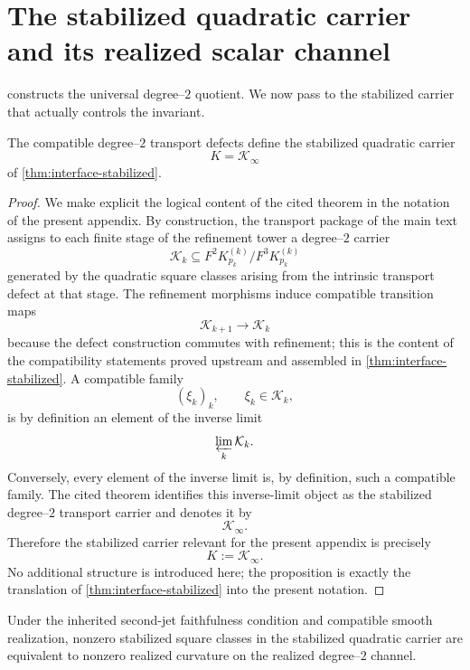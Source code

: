 \section{The stabilized quadratic carrier and its realized scalar channel}
\label{sec:fusion-K}
 constructs the universal degree--\(2\)
quotient.
We now pass to the stabilized carrier that actually controls the
invariant.
\begin{proposition}
	The compatible degree--\(2\) transport defects define the stabilized
	quadratic carrier
	\[
		K=\mathcal K_\infty
	\]
	of \cref{thm:interface-stabilized}.
\end{proposition}
\begin{proof}
	We make explicit the logical content of the cited theorem in the notation
	of the present appendix.
	By construction, the transport package of the main text assigns to each
	finite stage of the refinement tower a degree--\(2\) carrier
	\[
		\mathcal K_k
		\subseteq
		F^2K_{p_k}^{(k)}/F^3K_{p_k}^{(k)}
	\]
	generated by the quadratic square classes arising from the intrinsic
	transport defect at that stage.
	The refinement morphisms induce compatible transition maps
	\[
		\mathcal K_{k+1}\longrightarrow \mathcal K_k
	\]
	because the defect construction commutes with refinement; this is the
	content of the compatibility statements proved upstream and assembled in
	\cref{thm:interface-stabilized}.
	A compatible family
	\[
		(\xi_k)_k,\qquad \xi_k\in \mathcal K_k,
	\]
	is by definition an element of the inverse limit
	\[
		\varprojlim_k \mathcal K_k.
	\]
	Conversely, every element of the inverse limit is, by definition, such a
	compatible family. The cited theorem identifies this inverse-limit object
	as the stabilized degree--\(2\) transport carrier and denotes it by
	\[
		\mathcal K_\infty.
	\]
	Therefore the stabilized carrier relevant for the present appendix is
	precisely
	\[
		K:=\mathcal K_\infty.
	\]
	No additional structure is introduced here; the proposition is exactly
	the translation of \cref{thm:interface-stabilized} into the present
	notation.
\end{proof}
\begin{proposition}
	\label{prop:fusion-curvature}
	Under the inherited second-jet faithfulness condition and compatible
	smooth realization, nonzero stabilized square classes in the
	stabilized quadratic carrier are equivalent to nonzero realized
	curvature on the realized degree--\(2\) channel.
\end{proposition}
